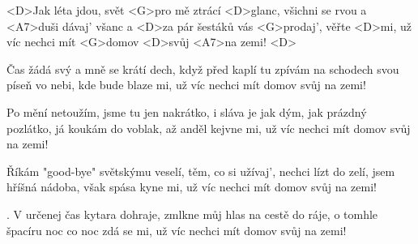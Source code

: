 

\zs
<D>Jak léta jdou, svět <G>pro mě ztrácí <D>glanc, 
všichni se rvou a <A7>duši dávaj' všanc 
a <D>za pár šestáků vás <G>prodaj', věřte <D>mi,
už víc nechci mít <G>domov <D>svůj <A7>na zemi! <D>
\ks

\zr
Čas žádá svý a mně se krátí dech, 
když před kaplí tu zpívám na schodech 
svou píseň vo nebi, kde bude blaze mi, 
už víc nechci mít domov svůj na zemi! 
\kr

\zs
Po mění netoužím, jsme tu jen nakrátko, 
i sláva je jak dým, jak prázdný pozlátko, 
já koukám do voblak, až anděl kejvne mi, 
už víc nechci mít domov svůj na zemi! 
\ks

\zr \kr 

\zs
Říkám "good-bye" světskýmu veselí, 
těm, co si užívaj', nechci lízt do zelí, 
jsem hříšná nádoba, však spása kyne mi, 
už víc nechci mít domov svůj na zemi! 
\ks

\zr \kr

. V určenej čas kytara dohraje, 
zmlkne můj hlas na cestě do ráje, 
o tomhle špacíru noc co noc zdá se mi, 
už víc nechci mít domov svůj na zemi! 
\ks

\zr \kr
\kp

